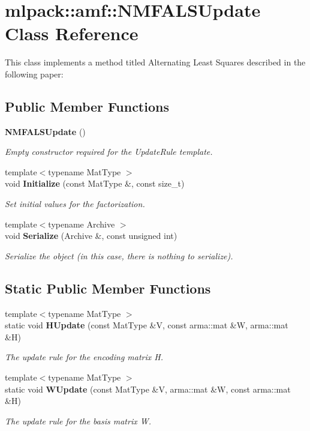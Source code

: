 \section{mlpack\+:\+:amf\+:\+:N\+M\+F\+A\+L\+S\+Update Class Reference}
\label{classmlpack_1_1amf_1_1NMFALSUpdate}


This class implements a method titled \textquotesingle{}Alternating Least Squares\textquotesingle{} described in the following paper\+:  


\subsection*{Public Member Functions}
\begin{DoxyCompactItemize}
\item 
{\bf N\+M\+F\+A\+L\+S\+Update} ()
\begin{DoxyCompactList}\small\item\em Empty constructor required for the Update\+Rule template. \end{DoxyCompactList}\item 
{\footnotesize template$<$typename Mat\+Type $>$ }\\void {\bf Initialize} (const Mat\+Type \&, const size\+\_\+t)
\begin{DoxyCompactList}\small\item\em Set initial values for the factorization. \end{DoxyCompactList}\item 
{\footnotesize template$<$typename Archive $>$ }\\void {\bf Serialize} (Archive \&, const unsigned int)
\begin{DoxyCompactList}\small\item\em Serialize the object (in this case, there is nothing to serialize). \end{DoxyCompactList}\end{DoxyCompactItemize}
\subsection*{Static Public Member Functions}
\begin{DoxyCompactItemize}
\item 
{\footnotesize template$<$typename Mat\+Type $>$ }\\static void {\bf H\+Update} (const Mat\+Type \&V, const arma\+::mat \&W, arma\+::mat \&H)
\begin{DoxyCompactList}\small\item\em The update rule for the encoding matrix H. \end{DoxyCompactList}\item 
{\footnotesize template$<$typename Mat\+Type $>$ }\\static void {\bf W\+Update} (const Mat\+Type \&V, arma\+::mat \&W, const arma\+::mat \&H)
\begin{DoxyCompactList}\small\item\em The update rule for the basis matrix W. \end{DoxyCompactList}\end{DoxyCompactItemize}


